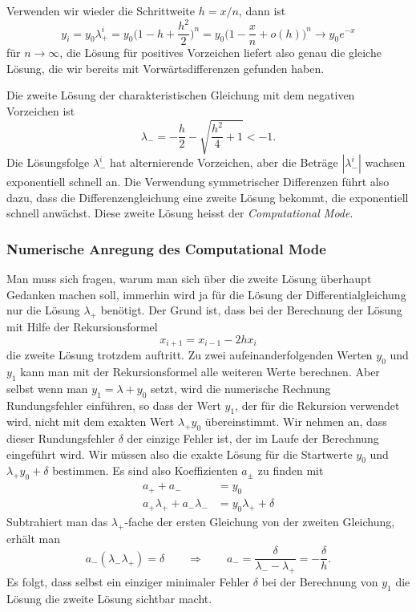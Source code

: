 Verwenden wir wieder die Schrittweite $h=x/n$, dann ist
\[
y_i
=
y_0 \lambda_+^i
=
y_0 \biggl(1-h+\frac{h^2}2\biggr)^n
=
y_0\biggl(1-\frac{x}n + o(h)\biggr)^n
\to
y_0e^{-x}
\]
für $n\to\infty$, die Lösung für positives Vorzeichen liefert also genau
die gleiche Lösung, die wir bereits mit Vorwärtsdifferenzen gefunden haben.

Die zweite Lösung der charakteristischen Gleichung mit dem negativen
Vorzeichen ist
\[
\lambda_-
=
-\frac{h}2 - \sqrt{\frac{h^2}{4}+1}
<
-1.
\]
Die Lösungsfolge $\lambda_-^i$ hat alternierende Vorzeichen, aber die 
Beträge $|\lambda_-^i|$ wachsen exponentiell schnell an.
Die Verwendung symmetrischer Differenzen führt also dazu, dass die
Differenzengleichung eine zweite Lösung bekommt, die exponentiell
schnell anwächst.
Diese zweite Lösung heisst der {\em Computational Mode}.

\subsubsection{Numerische Anregung des Computational Mode}
Man muss sich fragen, warum man sich über die zweite Lösung überhaupt
Gedanken machen soll, immerhin wird ja für die Lösung der
Differentialgleichung nur die Lösung $\lambda_+$ benötigt.
Der Grund ist, dass bei der Berechnung der Lösung mit Hilfe der
Rekursionsformel
\[
x_{i+1} = x_{i-1}-2hx_i
\]
die zweite Lösung trotzdem auftritt.
Zu zwei aufeinanderfolgenden Werten $y_0$ und $y_1$ kann man mit der
Rekursionsformel alle weiteren Werte berechnen.
Aber selbst wenn man $y_1 = \lambda+y_0$ setzt, wird die numerische
Rechnung Rundungsfehler einführen, so dass der Wert $y_1$, der für die
Rekursion verwendet wird, nicht mit dem exakten Wert $\lambda_+y_0$
übereinstimmt.
Wir nehmen an, dass dieser Rundungsfehler $\delta$ der einzige
Fehler ist, der im Laufe der Berechnung eingeführt wird.
Wir müssen also die exakte Lösung für die Startwerte $y_0$ und
$\lambda_+y_0+\delta$ bestimmen.
Es sind also Koeffizienten $a_\pm$ zu finden mit
\begin{align*}
a_+ + a_- &= y_0 \\
a_+\lambda_+ + a_-\lambda_-&=y_0\lambda_++\delta
\end{align*}
Subtrahiert man das $\lambda_+$-fache der ersten Gleichung von der
zweiten Gleichung, erhält man
\[
a_-(\lambda_-\lambda_+)=\delta
\qquad\Rightarrow\qquad
a_- = \frac{\delta}{\lambda_--\lambda_+} = -\frac{\delta}{h}.
\]
Es folgt, dass selbst ein einziger minimaler Fehler $\delta$
bei der Berechnung von $y_1$ die Lösung die zweite Lösung sichtbar
macht. 

